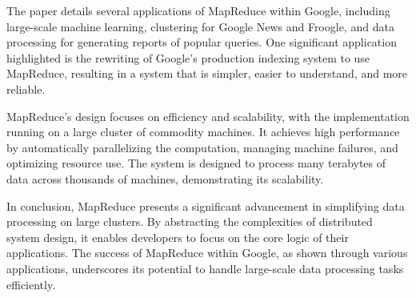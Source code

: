 \documentclass{article}
\begin{document}
The paper details several applications of MapReduce within Google, including large-scale machine learning, clustering for Google News and Froogle, and data processing for generating reports of popular queries. One significant application highlighted is the rewriting of Google's production indexing system to use MapReduce, resulting in a system that is simpler, easier to understand, and more reliable.

MapReduce's design focuses on efficiency and scalability, with the implementation running on a large cluster of commodity machines. It achieves high performance by automatically parallelizing the computation, managing machine failures, and optimizing resource use. The system is designed to process many terabytes of data across thousands of machines, demonstrating its scalability.

In conclusion, MapReduce presents a significant advancement in simplifying data processing on large clusters. By abstracting the complexities of distributed system design, it enables developers to focus on the core logic of their applications. The success of MapReduce within Google, as shown through various applications, underscores its potential to handle large-scale data processing tasks efficiently.
\end{document}
